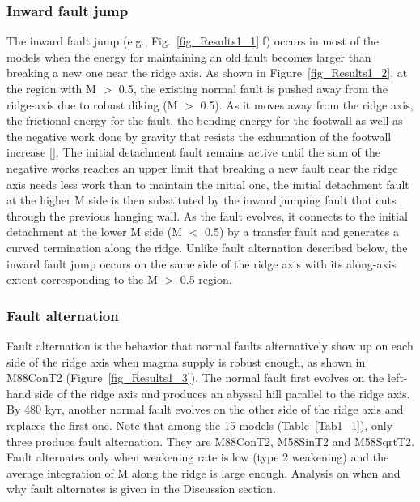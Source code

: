 \documentclass[draft,gc]{agutex}
\begin{document}
\begin{article}
\subsubsection{Inward fault jump}

The inward fault jump (e.g., Fig.~\ref{fig_Results1_1}.f) occurs in most of the models when the energy for maintaining an old fault becomes larger than breaking a new one near the ridge axis. As shown in Figure~\ref{fig_Results1_2}, at the region with M $>$ 0.5, the existing normal fault is pushed away from the ridge-axis due to robust diking (M $>$ 0.5). As it moves away from the ridge axis, the frictional energy for the fault, the bending energy for the footwall as well as the negative work done by gravity that resists the exhumation of the footwall increase [\citealp{Lavier2000, Olive2014}]. The initial detachment fault remains active until the sum of the negative works reaches an upper limit that breaking a new fault near the ridge axis needs less work than to maintain the initial one, the initial detachment fault at the higher M side is then substituted by the inward jumping fault that cuts through the previous hanging wall. As the fault evolves, it connects to the initial detachment at the lower M side (M $<$ 0.5) by a transfer fault and generates a curved termination along the ridge. Unlike fault alternation described below, the inward fault jump occurs on the same side of the ridge axis with its along-axis extent corresponding to the M $>$ 0.5 region.

\subsubsection{Fault alternation}

Fault alternation is the behavior that normal faults alternatively show up on each side of the ridge axis when magma supply is robust enough, as shown in M88ConT2 (Figure~\ref{fig_Results1_3}). The normal fault first evolves on the left-hand side of the ridge axis and produces an abyssal hill parallel to the ridge axis. By 480 kyr, another normal fault evolves on the other side of the ridge axis and replaces the first one. Note that among the 15 models (Table~\ref{Tab1_1}), only three produce fault alternation. They are M88ConT2, M58SinT2 and M58SqrtT2. Fault alternates only when weakening rate is low (type 2 weakening) and the average integration of M along the ridge is large enough. Analysis on when and why fault alternates is given in the Discussion section.


\end{article}
\end{document}

